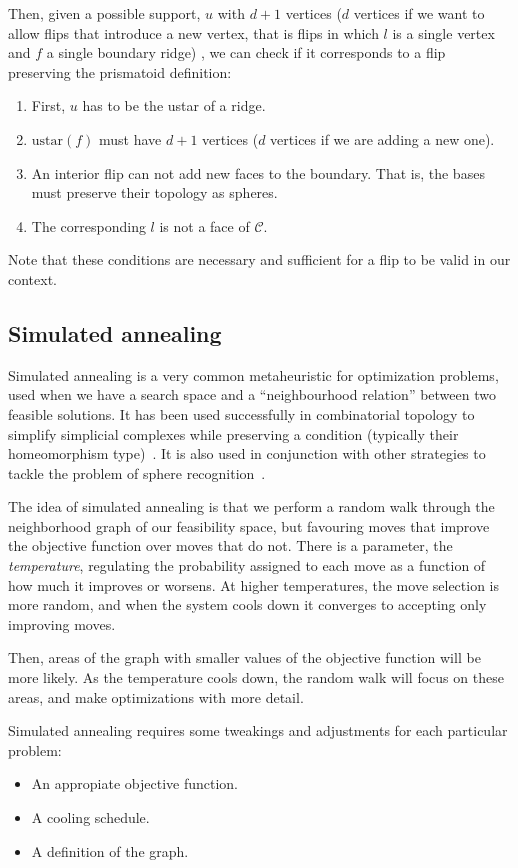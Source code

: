 \documentclass[12pt,a4paper]{article}
\theoremstyle{plain}
\theoremstyle{definition}
\begin{document}
Then, given a possible support, $u$ with $d+1$ vertices ($d$ vertices if we want to allow flips that introduce a new vertex, that is flips in which $l$ is a single vertex and $f$ a single boundary ridge)
, we can check if it corresponds to a flip preserving the prismatoid definition:

\begin{enumerate}
  \item First, $u$ has to be the ustar of a ridge.
  \item $\text{ustar}(f)$ must have $d+1$ vertices ($d$ vertices if we are adding a new one).
  \item An interior flip can not add new faces to the boundary. That is, the bases must preserve their topology as spheres.
  \item The corresponding $l$ is not a face of $\mathcal{C}$.
\end{enumerate}

Note that these conditions are necessary and sufficient for a flip to be valid in our context.

\subsection{Simulated annealing}
Simulated annealing is a very common metaheuristic for optimization problems, used when we have a search space and a ``neighbourhood relation'' between two feasible solutions. It has been used successfully in combinatorial topology to simplify simplicial complexes while preserving a condition (typically their homeomorphism type)~\cite{Lutz}. It is also used in conjunction with other strategies to tackle the problem of sphere recognition~\cite{LutzMimi}.

The idea of simulated annealing is that we perform a random walk through the neighborhood graph of our feasibility space, but favouring moves that improve the objective function over moves that do not. There is a parameter, the \emph{temperature}, regulating the probability assigned to each move as a function of how much it improves or worsens. At higher temperatures, the move selection is more random, and when the system cools down it converges to accepting only improving moves. 

Then, areas of the graph with smaller values of the objective function will be more likely. As the temperature cools down, the random walk will focus on these areas, and make optimizations with more detail.

Simulated annealing requires some tweakings and adjustments for each particular problem:
\begin{itemize}
  \item An appropiate objective function.
  \item A cooling schedule.
  \item A definition of the graph.
\end{itemize}
\end{document}

